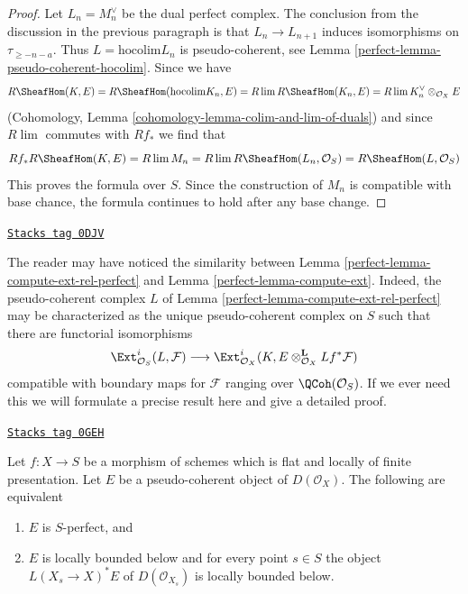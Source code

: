 \begin{proof}
\medskip\noindent
Let $L_n = M_n^\vee$ be the dual perfect complex. The
conclusion from the discussion in the previous paragraph is that
$L_n \to L_{n + 1}$ induces isomorphisms on $\tau_{\geq -n - a}$.
Thus $L = \text{hocolim} L_n$ is pseudo-coherent, see
Lemma \ref{perfect-lemma-pseudo-coherent-hocolim}.
Since we have
$$
R\SheafHom(K, E) = R\SheafHom(\text{hocolim} K_n, E) =
R\lim R\SheafHom(K_n, E) = R\lim K_n^\vee \otimes_{\mathcal{O}_X} E
$$
(Cohomology, Lemma \ref{cohomology-lemma-colim-and-lim-of-duals})
and since $R\lim$ commutes with $Rf_*$ we find that
$$
Rf_*R\SheafHom(K, E) = R\lim M_n = R\lim R\SheafHom(L_n, \mathcal{O}_S) =
R\SheafHom(L, \mathcal{O}_S)
$$
This proves the formula over $S$. Since the construction of $M_n$ is
compatible with base chance, the formula continues to hold after
any base change.
\end{proof}

\begin{remark}[Compare L]
\label{perfect-remark-compare-L}
\href{https://stacks.math.columbia.edu/tag/0DJV}{\texttt{Stacks tag 0DJV}}

The reader may have noticed the similarity between
Lemma \ref{perfect-lemma-compute-ext-rel-perfect} and
Lemma \ref{perfect-lemma-compute-ext}.
Indeed, the pseudo-coherent complex $L$ of
Lemma \ref{perfect-lemma-compute-ext-rel-perfect}
may be characterized as the unique pseudo-coherent complex
on $S$ such that there are functorial isomorphisms
$$
\Ext^i_{\mathcal{O}_S}(L, \mathcal{F}) \longrightarrow
\Ext^i_{\mathcal{O}_X}(K,
E \otimes_{\mathcal{O}_X}^\mathbf{L} Lf^*\mathcal{F})
$$
compatible with boundary maps for $\mathcal{F}$ ranging over
$\QCoh(\mathcal{O}_S)$. If we ever need this we will
formulate a precise result here and give a detailed proof.
\end{remark}

\begin{lemma}
\label{perfect-lemma-bounded-on-fibres}
\href{https://stacks.math.columbia.edu/tag/0GEH}{\texttt{Stacks tag 0GEH}}

Let $f : X \to S$ be a morphism of schemes which is flat and
locally of finite presentation. Let $E$ be a pseudo-coherent
object of $D(\mathcal{O}_X)$. The following are equivalent
\begin{enumerate}
\item $E$ is $S$-perfect, and
\item $E$ is locally bounded below and for every point $s \in S$
the object $L(X_s \to X)^*E$ of $D(\mathcal{O}_{X_s})$
is locally bounded below.
\end{enumerate}
\end{lemma}

